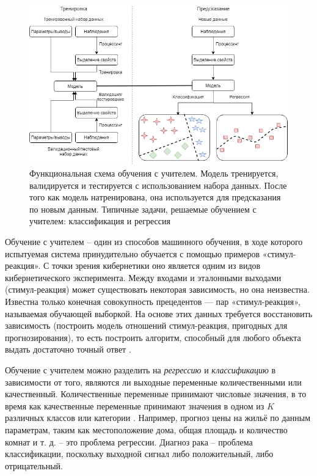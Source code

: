 \begin{figure}[ht!]
	\center
	\includegraphics [scale=0.60] {my_folder/images/ch1/supervised-learning.png}
	\caption{Функциональная схема обучения с учителем. Модель тренируется, валидируется и тестируется с использованием набора данных. После того как модель натренирована, она используется для предсказания по новым данным. Типичные задачи, решаемые обучением с учителем: классификация и регрессия}
	\label{fig:supervised-learning}
\end{figure}

Обучение с учителем -- один из способов машинного обучения, в ходе которого испытуемая система принудительно обучается с помощью примеров «стимул-реакция». С точки зрения кибернетики оно является одним из видов кибернетического эксперимента. Между входами и эталонными выходами (стимул-реакция) может существовать некоторая зависимость, но она неизвестна. Известна только конечная совокупность прецедентов — пар «стимул-реакция», называемая обучающей выборкой. На основе этих данных требуется восстановить зависимость (построить модель отношений стимул-реакция, пригодных для прогнозирования), то есть построить алгоритм, способный для любого объекта выдать достаточно точный ответ \cite{james2014introduction}.

Обучение с учителем можно разделить на \textit{регрессию} и \textit{классификацию} в зависимости от того, являются ли выходные переменные количественными или качественный. Количественные переменные принимают числовые значения, в то время как качественные переменные принимают значения в одном из $K$ различных классов или категории \cite{james2014introduction}. Например, прогноз цены на жильё по данным параметрам, таким как местоположение дома, общая площадь и количество комнат и т. д. -- это проблема регрессии. Диагноз рака -- проблема классификации, поскольку выходной сигнал либо положительный, либо отрицательный.

